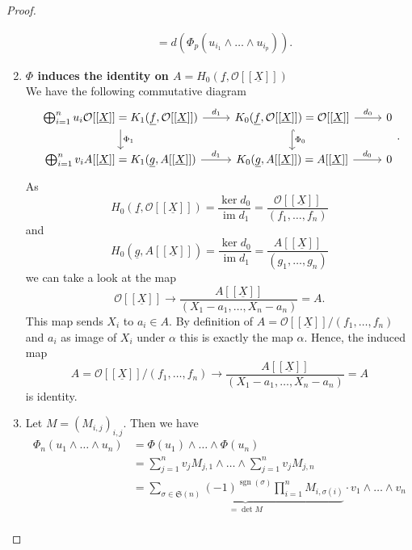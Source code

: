 \documentclass{article}
\theoremstyle{plain}%
\theoremstyle{definition}
\theoremstyle{remark}
\newcommand{\im}{\operatorname{im}}
\begin{document}
\begin{proof}
\begin{enumerate}
\begin{align*}
            &= d(\Phi_p(u_{i_1}\wedge\dots\wedge u_{i_p})).
        \end{align*}
        \item \textbf{\(\Phi\) induces the identity on \(A = H_0(\underline{f}, \mathcal{O}[[\underline{X}]])\)}\\
        We have the following commutative diagram
        \[
            \begin{tikzcd}
                \bigoplus_{i=1}^n u_i \mathcal{O}[[\underline{X}]] = K_1(\underline{f}, \mathcal{O}[[\underline{X}]]) 
                \arrow[r, "d_1"] \arrow[d, "\Phi_1"] & K_0(\underline{f}, \mathcal{O}[[\underline{X}]]) \arrow[r, "d_0"] 
                \arrow[d, hook, "\Phi_0"] = \mathcal{O}[[\underline{X}]] & 0\\
                \bigoplus_{i=1}^n v_i A[[\underline{X}]] = K_1(\underline{g}, A[[\underline{X}]]) 
                \arrow[r, "d_1"] & K_0(\underline{g}, A[[\underline{X}]]) = A[[\underline{X}]] \arrow[r, "d_0"] & 0
            \end{tikzcd}.
        \]
        As 
        \[
            H_0(\underline{f}, \mathcal{O}[[\underline{X}]]) = \frac{\ker d_0}{\im d_1} 
            = \frac{\mathcal{O}[[\underline{X}]]}{(f_1, \dots, f_n)}
        \] and
        \[
            H_0(\underline{g}, A[[\underline{X}]]) = \frac{\ker d_0}{\im d_1} 
            = \frac{A[[\underline{X}]]}{(g_1, \dots, g_n)}
        \]
        we can take a look at the map
        \[
            \mathcal{O}[[\underline{X}]] \to \frac{A[[\underline{X}]]}{(X_1 - a_1, \dots, X_n - a_n)} = A.
        \]
        This map sends \(X_i\) to \(a_i \in A\).
        By definition of \(A = \mathcal{O}[[\underline{X}]]/(f_1, \dots, f_n)\) and \(a_i\) as image of \(X_i\)
        under \(\alpha\) this is exactly the map \(\alpha\). Hence, the induced map
        \[
            A = \mathcal{O}[[\underline{X}]]/(f_1, \dots, f_n) \to 
            \frac{A[[\underline{X}]]}{(X_1 - a_1, \dots, X_n - a_n)} = A
        \]
        is identity.
        \item Let \(M = (M_{i,j})_{i,j}\). Then we have
        \begin{align*}
            \Phi_n(u_1 \wedge \dots \wedge u_n) &= \Phi(u_1) \wedge \dots \wedge \Phi(u_n)\\
            &= \sum_{j=1}^n v_jM_{j,1} \wedge \dots \wedge \sum_{j=1}^n v_jM_{j,n}\\
            &= \underbrace{\sum_{\sigma \in \mathfrak{S}(n)} (-1)^{\operatorname{sgn}(\sigma)} 
            \prod_{i=1}^n M_{i,\sigma(i)}}_{= \det M} \cdot v_1 \wedge \dots \wedge v_n\\

\end{align*}
\end{enumerate}
\end{proof}
\end{document}
